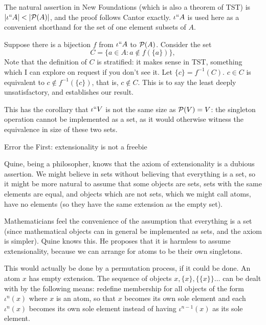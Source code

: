 \documentclass[12pt]{slides}
\begin{document}
\begin{slide}

The natural assertion in New Foundations (which is also a theorem of TST) is $|\iota``A| < |{\cal P}(A)|$, and the proof follows Cantor exactly.  $\iota``A$ is used here as a convenient shorthand for the set of one element subsets of $A$.

Suppose there is a bijection $f$ from $\iota``A$ to ${\cal P}(A)$.  Consider the set $$C = \{a \in A:a \not\in f(\{a\})\},$$ Note that the definition of $C$ is stratified:  it makes sense in TST, something which I can explore on request if you don't see it.  Let $\{c\} = f^{-1}(C)$.  $c \in C$ is equivalent to $c \not\in f^{-1}(\{c\})$, that is,
$c \not\in C$.  This is to say the least deeply unsatisfactory, and establishes our result.

This has the corollary that $\iota``V$ is not the same size as ${\cal P}(V) = V$:  the singleton operation cannot be implemented as a set, as it would otherwise witness the equivalence in size of these two sets.


\end{slide}

\begin{slide}

{\Large Error the First:  extensionality is not a freebie}

Quine, being a philosopher, knows that the axiom of extensionality is a dubious assertion.  We might believe in sets without believing that everything is a set,
so it might be more natural to assume that some objects are sets, sets with the same elements are equal, and objects which are not sets, which we might call atoms,  have no elements
(so they have the same extension as the empty set).

Mathematicians feel the convenience of the assumption that everything is a set (since mathematical objects can in general be implemented as sets, and the axiom is simpler).  Quine knows this.  He proposes that it is harmless to assume extensionality, because we can arrange for atoms to be their own singletons.

This would actually be done by a permutation process, if it could be done.  An atom $x$ has empty extension.  The sequence of objects $x, \{x\}, \{\{x\}\}\ldots$
can be dealt with by the following means:  redefine membership for all objects of the form $\iota^n(x)$ where $x$ is an atom, so that $x$ becomes its own sole element and each $\iota^n(x)$ becomes its own sole element instead of having  $\iota^{n-1}(x)$ as its sole element.

\end{slide}
\end{document}
